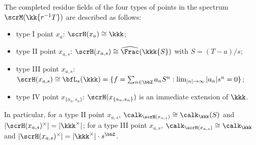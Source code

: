     \begin{proposition}\label{prop:the_complete_residue_field_of_all_four_types_points_in__spectrum_of_Tate_algebra_in_one_variable}
        The completed residue fields of the four types of points in the spectrum \(\scrM(\kk\{r^{-1}T\})\) are described as follows:
        \begin{itemize}
            \item type I point \(x_a\): \(\scrH(x_a) \cong \kkk\);
            \item type II point \(x_{a,s}\): \(\scrH(x_{a,s}) \cong \widehat{\Frac}(\kkk\{S\})\) with \(S = (T - a)/s\);
            \item type III point \(x_{a,s}\): \(\scrH(x_{a,s}) \cong \bfL_{s}(\kkk) = \{f = \sum_{n\in \bbZ} a_n S^n : \lim_{|n| \to \infty} |a_n| s^n = 0\}\);
            \item type IV point \(x_{\{a_n,s_n\}}\): \(\scrH(x_{\{a_n,s_n\}})\) is an immediate extension of \(\kkk\).
        \end{itemize}
        In particular, for a type II point \(x_{a,s}\), \(\calk_{\scrH(x_{a,s})} \cong \calk_\kkk(S)\) and \(|\scrH(x_{a,s})^\times| = |\kkk^\times|\);
        for a type III point \(x_{a,s}\), \(\calk_{\scrH(x_{a,s})} \cong \calk_\kkk\) and \(|\scrH(x_{a,s})^\times| = |\kkk^\times| \cdot s^\bbZ\).
    \end{proposition}
